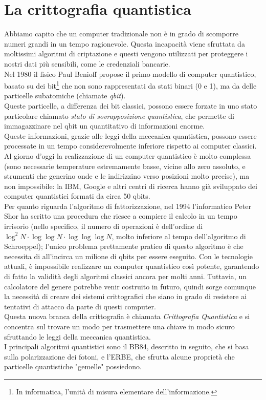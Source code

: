 \documentclass[italian,A4,12pt]{article}
\begin{document}
  \section{La crittografia quantistica}
    Abbiamo capito che un computer tradizionale non è in grado di scomporre numeri grandi in un tempo ragionevole. Questa incapacità viene sfruttata da moltissimi algoritmi di criptazione e questi vengono utilizzati per proteggere i nostri dati più sensibili, come le credenziali bancarie.\\
    Nel 1980 il fisico Paul Benioff propose il primo modello di computer quantistico, basato su dei bit\footnote{In informatica, l'unità di misura elementare dell'informazione.} che non sono rappresentati da stati binari (0 e 1), ma da delle particelle subatomiche (chiamate \textit{qbit}).\\
    Queste particelle, a differenza dei bit classici, possono essere forzate in uno stato particolare chiamato \textit{stato di sovrapposizione quantistica}, che permette di immagazzinare nel qbit un quantitativo di informazioni enorme.\\
    Queste informazioni, grazie alle leggi della meccanica quantistica, possono essere processate in un tempo considerevolmente inferiore rispetto ai computer classici.\\
    Al giorno d'oggi la realizzazione di un computer quantistico è molto complessa (sono necessarie temperature estremamente basse, vicine allo zero assoluto, e strumenti che generino onde e le indirizzino verso posizioni molto precise), ma non impossibile: la IBM, Google e altri centri di ricerca hanno già sviluppato dei computer quantistici formati da circa 50 qbits.\\
    Per quanto riguarda l'algoritmo di fattorizzazione, nel 1994 l'informatico Peter Shor ha scritto una procedura che riesce a compiere il calcolo in un tempo irrisorio (nello specifico, il numero di operazioni è dell'ordine di $\log^2{N}\cdot\log{\log{N}}\cdot\log{\log{\log{N}}}$, molto inferiore al tempo dell'algoritmo di Schroeppel); l'unico problema prettamente pratico di questo algoritmo è che necessita di all'incirca un milione di qbits per essere eseguito.
    Con le tecnologie attuali, è impossibile realizzare un computer quantistico così potente, garantendo di fatto la validità degli algoritmi classici ancora per molti anni. Tuttavia, un calcolatore del genere potrebbe venir costruito in futuro, quindi sorge comunque la necessità di creare dei sistemi crittografici che siano in grado di resistere ai tentativi di attacco da parte di questi computer.\\
    Questa nuova branca della crittografia è chiamata \textit{Crittografia Quantistica} e si concentra sul trovare un modo per trasmettere una chiave in modo sicuro sfruttando le leggi della meccanica quantistica.\\
    I principali algoritmi quantistici sono il BB84, descritto in seguito, che si basa sulla polarizzazione dei fotoni, e l'ERBE, che sfrutta alcune proprietà che particelle quantistiche "gemelle" possiedono.
\end{document}

